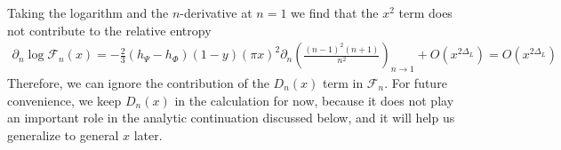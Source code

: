 \documentclass[11pt]{article}
\newcommand{\lb}{\left(}
\newcommand{\rb}{\right)}
\newcommand{\JM}[1]{\textcolor{orange}{#1}}
\begin{document}
Taking the logarithm and the $n$-derivative at $n=1$ we find that the $x^2$ term does not contribute to the relative entropy
\begin{align}
\partial_n\log \mathcal{F}_n(x)=-\frac{2}{3}(h_\Psi-h_\Phi)(1-y)(\pi x)^2\partial_n \lb  \frac{(n-1)^2 (n+1)}{n^2}\rb_{n\to 1}+O(x^{2\Delta_L})=O(x^{2\Delta_L})
\end{align}
Therefore, we can ignore the contribution of the $D_n(x)$ term in $\mathcal{F}_n$. For future convenience, we keep $D_n(x)$ in the calculation for now, because it does not play an important role in the analytic continuation discussed below, and it will help us generalize to general $x$ later. 
\end{document}
